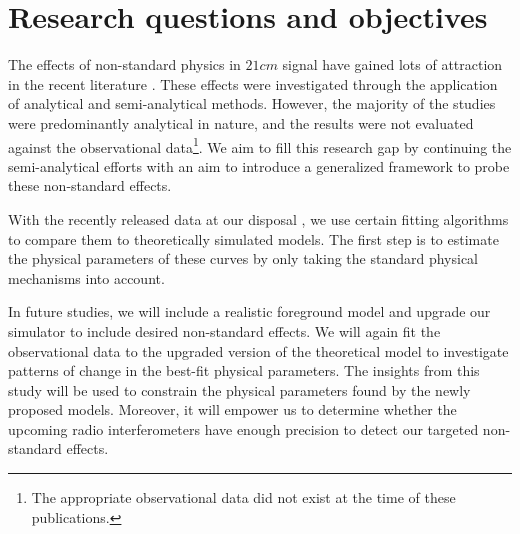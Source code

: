 \documentclass[12pt, TexShade, letterpaper]{report}
\begin{document}
\section{Research questions and objectives}
The effects of non-standard physics in $21cm$ signal have gained lots of attraction in the recent literature \cite{WF_effect_oscar, constrain_dm_21, bh_cosmioc_dawn, cosmic_string_oscar}. These effects were investigated through the application of analytical and semi-analytical methods. However, the majority of the studies were predominantly analytical in nature, and the results were not evaluated against the observational data\footnote{The appropriate observational data did not exist at the time of these publications.}. We aim to fill this research gap by continuing the semi-analytical efforts with an aim to introduce a generalized framework to probe these non-standard effects.\par
With the recently released data at our disposal \cite{edges}, we use certain fitting algorithms to compare them to theoretically simulated models\cite{ares2014jordan}. 
The first step is to estimate the physical parameters of these curves by only taking the standard physical mechanisms into account.\par
In future studies, we will include a realistic foreground model and upgrade our simulator to include desired non-standard effects. We will again fit the observational data to the upgraded version of the theoretical model to investigate patterns of change in the best-fit physical parameters. The insights from this study will be used to constrain the physical parameters found by the newly proposed models. Moreover, it will empower us to determine whether the upcoming radio interferometers have enough precision to detect our targeted non-standard effects.\par
\end{document}
